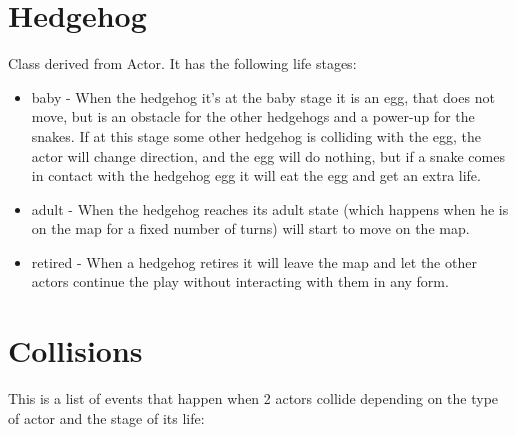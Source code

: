 \section{\Large Hedgehog}
    Class derived from Actor. It has the following life stages:
    \begin{itemize}
        \item {baby - When the hedgehog it's at the baby stage it is an egg, that does not move, but is an obstacle for the other hedgehogs and a power-up for the snakes. If at this stage some other hedgehog is colliding with the egg, the actor will change direction, and the egg will do nothing, but if a snake comes in contact with the hedgehog egg it will eat the egg and get an extra life.}
        \item {adult - When the hedgehog reaches its adult state (which happens when he is on the map for a fixed number of turns) will start to move on the map.}
        \item {retired - When a hedgehog retires it will leave the map and let the other actors continue the play without interacting with them in any form.}
    \end{itemize}

\section{\Large Collisions}
    This is a list of events that happen when 2 actors collide depending on the type of actor and the stage of its life:
    

